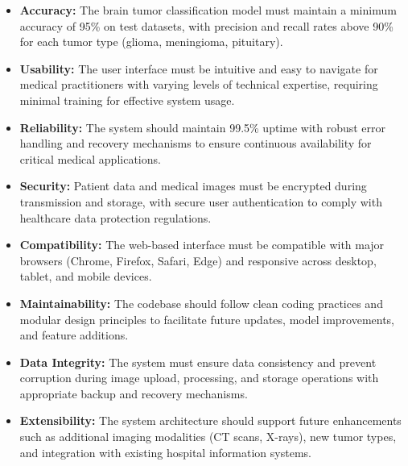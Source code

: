 \begin{enumerate}[label=\roman*.]
\begin{itemize}
              \item \textbf{Accuracy:} The brain tumor classification model must maintain a minimum accuracy of 95\% on test datasets, with precision and recall rates above 90\% for each tumor type (glioma, meningioma, pituitary).

              \item \textbf{Usability:} The user interface must be intuitive and easy to navigate for medical practitioners with varying levels of technical expertise, requiring minimal training for effective system usage.

              \item \textbf{Reliability:} The system should maintain 99.5\% uptime with robust error handling and recovery mechanisms to ensure continuous availability for critical medical applications.

              \item \textbf{Security:} Patient data and medical images must be encrypted during transmission and storage, with secure user authentication to comply with healthcare data protection regulations.

              \item \textbf{Compatibility:} The web-based interface must be compatible with major browsers (Chrome, Firefox, Safari, Edge) and responsive across desktop, tablet, and mobile devices.

              \item \textbf{Maintainability:} The codebase should follow clean coding practices and modular design principles to facilitate future updates, model improvements, and feature additions.

              \item \textbf{Data Integrity:} The system must ensure data consistency and prevent corruption during image upload, processing, and storage operations with appropriate backup and recovery mechanisms.

              \item \textbf{Extensibility:} The system architecture should support future enhancements such as additional imaging modalities (CT scans, X-rays), new tumor types, and integration with existing hospital information systems.
          \end{itemize}

\end{enumerate}

